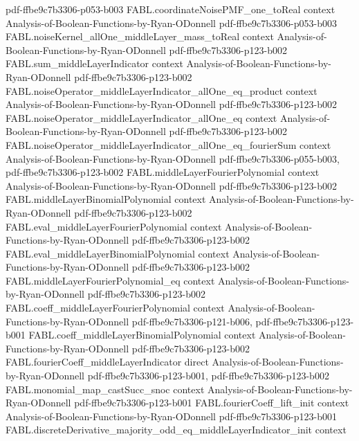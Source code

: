\begin{theorem}
  {pdf-ffbe9c7b3306-p053-b003}
\proofstep
  {FABL.coordinateNoisePMF_one_toReal}
  {context}
  {Analysis-of-Boolean-Functions-by-Ryan-ODonnell}
  {pdf-ffbe9c7b3306-p053-b003}
\proofstep
  {FABL.noiseKernel_allOne_middleLayer_mass_toReal}
  {context}
  {Analysis-of-Boolean-Functions-by-Ryan-ODonnell}
  {pdf-ffbe9c7b3306-p123-b002}
\proofstep
  {FABL.sum_middleLayerIndicator}
  {context}
  {Analysis-of-Boolean-Functions-by-Ryan-ODonnell}
  {pdf-ffbe9c7b3306-p123-b002}
\proofstep
  {FABL.noiseOperator_middleLayerIndicator_allOne_eq_product}
  {context}
  {Analysis-of-Boolean-Functions-by-Ryan-ODonnell}
  {pdf-ffbe9c7b3306-p123-b002}
\proofstep
  {FABL.noiseOperator_middleLayerIndicator_allOne_eq}
  {context}
  {Analysis-of-Boolean-Functions-by-Ryan-ODonnell}
  {pdf-ffbe9c7b3306-p123-b002}
\proofstep
  {FABL.noiseOperator_middleLayerIndicator_allOne_eq_fourierSum}
  {context}
  {Analysis-of-Boolean-Functions-by-Ryan-ODonnell}
  {pdf-ffbe9c7b3306-p055-b003,
    pdf-ffbe9c7b3306-p123-b002}
\proofstep
  {FABL.middleLayerFourierPolynomial}
  {context}
  {Analysis-of-Boolean-Functions-by-Ryan-ODonnell}
  {pdf-ffbe9c7b3306-p123-b002}
\proofstep
  {FABL.middleLayerBinomialPolynomial}
  {context}
  {Analysis-of-Boolean-Functions-by-Ryan-ODonnell}
  {pdf-ffbe9c7b3306-p123-b002}
\proofstep
  {FABL.eval_middleLayerFourierPolynomial}
  {context}
  {Analysis-of-Boolean-Functions-by-Ryan-ODonnell}
  {pdf-ffbe9c7b3306-p123-b002}
\proofstep
  {FABL.eval_middleLayerBinomialPolynomial}
  {context}
  {Analysis-of-Boolean-Functions-by-Ryan-ODonnell}
  {pdf-ffbe9c7b3306-p123-b002}
\proofstep
  {FABL.middleLayerFourierPolynomial_eq}
  {context}
  {Analysis-of-Boolean-Functions-by-Ryan-ODonnell}
  {pdf-ffbe9c7b3306-p123-b002}
\proofstep
  {FABL.coeff_middleLayerFourierPolynomial}
  {context}
  {Analysis-of-Boolean-Functions-by-Ryan-ODonnell}
  {pdf-ffbe9c7b3306-p121-b006,
    pdf-ffbe9c7b3306-p123-b001}
\proofstep
  {FABL.coeff_middleLayerBinomialPolynomial}
  {context}
  {Analysis-of-Boolean-Functions-by-Ryan-ODonnell}
  {pdf-ffbe9c7b3306-p123-b002}
\proofstep
  {FABL.fourierCoeff_middleLayerIndicator}
  {direct}
  {Analysis-of-Boolean-Functions-by-Ryan-ODonnell}
  {pdf-ffbe9c7b3306-p123-b001,
    pdf-ffbe9c7b3306-p123-b002}
\proofstep
  {FABL.monomial_map_castSucc_snoc}
  {context}
  {Analysis-of-Boolean-Functions-by-Ryan-ODonnell}
  {pdf-ffbe9c7b3306-p123-b001}
\proofstep
  {FABL.fourierCoeff_lift_init}
  {context}
  {Analysis-of-Boolean-Functions-by-Ryan-ODonnell}
  {pdf-ffbe9c7b3306-p123-b001}
\proofstep
  {FABL.discreteDerivative_majority_odd_eq_middleLayerIndicator_init}
  {context}

\end{theorem}
